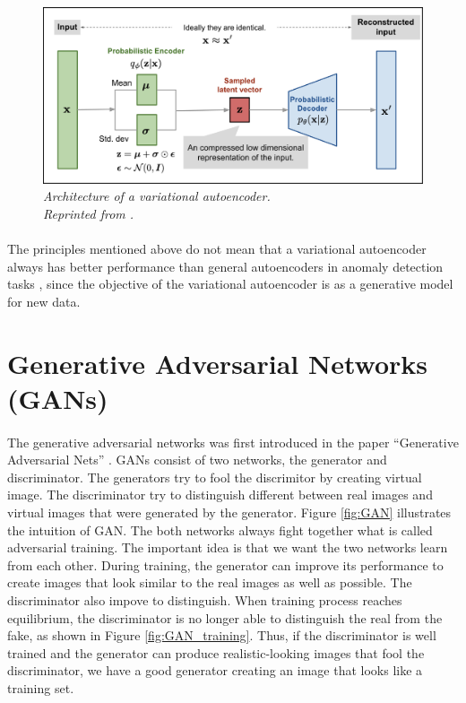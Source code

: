 \begin{figure}[H]
  \centering
  \caption[Architecture of a variational autoencoder.]{\emph{Architecture of a variational autoencoder. \\
  Reprinted from \citeauthor{weng_2018} \citeyear{weng_2018}.}}\label{fig:VAE}
  \includegraphics[scale = 0.15]{figures/VAE.jpg}  
\end{figure}

\paragraph{}
The principles mentioned above do not mean that a variational autoencoder always has better performance than general autoencoders in anomaly detection tasks \cite{agmon_2021}, since the objective of the variational autoencoder is as a generative model for new data.

\section{Generative Adversarial Networks (GANs)}
\paragraph{}
The generative adversarial networks was first introduced in the paper ``Generative Adversarial Nets'' \cite{goodfellow_pouget_abadie_mirza_xu_warde_farley_ozair_courville_bengio_2014}. GANs consist of two networks, the generator and discriminator. The generators try to fool the discrimitor by creating virtual image. The discriminator try to distinguish different between real images and virtual images that were generated by the generator. Figure \ref{fig:GAN} illustrates the intuition of GAN. The both networks always fight together what is called adversarial training. The important idea is that we want the two networks learn from each other. During training, the generator can improve its performance to create images that look similar to the real images as well as possible. The discriminator also impove to distinguish. When training process reaches equilibrium, the discriminator is no longer able to distinguish the real from the fake, as shown in Figure \ref{fig:GAN_training}. Thus, if the discriminator is well trained and the generator can produce realistic-looking images that fool the discriminator, we have a good generator creating an image that looks like a training set. 

